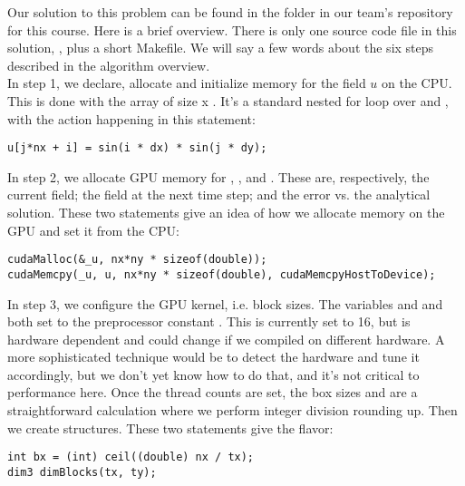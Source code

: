 Our solution to this problem can be found in the folder  in our team's repository for this course.
Here is a brief overview.  There is only one source code file in this solution, ,
plus a short Makefile.  We will say a few words about the six steps described in the algorithm overview. \\

In step 1, we declare, allocate and initialize memory for the field $u$ on the CPU.  
This is done with the array  of size  x .  
It's a standard nested for loop over  and , with the action happening in this statement:
\begin{lstlisting}[style=CodeSnippet]
u[j*nx + i] = sin(i * dx) * sin(j * dy); 
\end{lstlisting}

In step 2, we allocate GPU memory for , , and .
These are, respectively, the current field; the field at the next time step; 
and the error vs. the analytical solution.  
These two statements give an idea of how we allocate memory on the GPU and set it from the CPU:
\begin{lstlisting}[style=CodeSnippet]
cudaMalloc(&_u, nx*ny * sizeof(double));
cudaMemcpy(_u, u, nx*ny * sizeof(double), cudaMemcpyHostToDevice);
\end{lstlisting}

In step 3, we configure the GPU kernel, i.e. block sizes.
The variables  and  and both set to the preprocessor constant .
This is currently set to 16, but is hardware dependent and could change if we compiled on different hardware.
A more sophisticated technique would be to detect the hardware and tune it accordingly, 
but we don't yet know how to do that, and it's not critical to performance here.
Once the thread counts are set, the box sizes  and  are a straightforward 
calculation where we perform integer division rounding up.  Then we create  structures.
These two statements give the flavor:
\begin{lstlisting}[style=CodeSnippet]
int bx = (int) ceil((double) nx / tx);
dim3 dimBlocks(tx, ty);
\end{lstlisting}

